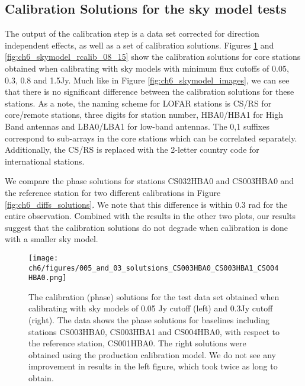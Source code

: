 \begin{subappendices}




\section{Calibration Solutions for the sky model tests }\label{ap:calib_solutions}
The output of the calibration step is a data set corrected for direction independent effects, as well as a set of calibration solutions. Figures \ref{fig:ch6_skymodel_rcalib_004_03} and \ref{fig:ch6_skymodel_rcalib_08_15} show the calibration solutions for core stations obtained when calibrating with sky models with minimum flux cutoffs of 0.05, 0.3, 0.8 and 1.5Jy. Much like in Figure \ref{fig:ch6_skymodel_images}, we can see that there is no significant difference between the calibration solutions for these stations. As a note, the naming scheme for LOFAR stations is CS/RS for core/remote stations, three digits for station number, HBA0/HBA1 for High Band antennas and LBA0/LBA1 for low-band antennas. The 0,1 suffixes correspond to sub-arrays in the core stations which can be correlated separately. Additionally, the CS/RS is replaced with the 2-letter country code for international stations\citep{staiton_data_cookbook}.

We compare the phase solutions for stations CS032HBA0 and CS003HBA0 and the reference station for two different calibrations in Figure \ref{fig:ch6_diffs_solutions}. We note that this difference is within 0.3 rad for the entire observation. Combined with the results in the other two plots, our results suggest that the calibration solutions do not degrade when calibration is done with a smaller sky model.

\begin{figure}
    \texttt{[image: ch6/figures/005\_and\_03\_solutsions\_CS003HBA0\_CS003HBA1\_CS004HBA0.png]}
      \caption[Calibration Solutions for sky models with low flux cutoff]{The calibration (phase) solutions for the test data set obtained when calibrating with sky models of 0.05 Jy cutoff (left) and 0.3Jy cutoff (right). The data shows the phase solutions for baselines including stations CS003HBA0, CS003HBA1 and CS004HBA0, with respect to the reference station, CS001HBA0. The right solutions were obtained using the production calibration model. We do not see any improvement in results in the left figure, which took twice as long to obtain.}
	\label{fig:ch6_skymodel_rcalib_004_03}
\end{figure}


\end{subappendices}
